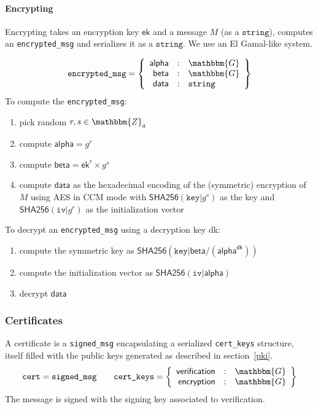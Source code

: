 \documentclass[a4paper]{article}
\newcommand{\G}{\mathbbm{G}}
\newcommand{\Z}{\mathbbm{Z}}
\newcommand{\jstring}{\texttt{string}}
\begin{document}
\paragraph{Encrypting}

Encrypting takes an encryption key $\textsf{ek}$ and a message $M$ (as
a $\jstring$), computes an \texttt{encrypted\_msg} and serializes it
as a $\jstring$. We use an El Gamal-like system.

\begin{gather*}
  \texttt{encrypted\_msg}=\left\{
    \begin{array}{rcl}
      \textsf{alpha}&:&\G\\
      \textsf{beta}&:&\G\\
      \textsf{data}&:&\jstring
    \end{array}
  \right\}
\end{gather*}
To compute the \texttt{encrypted\_msg}:
\begin{enumerate}
\item pick random $r,s\in\Z_q$
\item compute $\textsf{alpha}=g^r$
\item compute $\textsf{beta}=\textsf{ek}^r\times g^s$
\item compute $\textsf{data}$ as the hexadecimal encoding of the (symmetric)
  encryption of $M$ using AES in CCM mode with
  $\textsf{SHA256}(\texttt{key|}g^s)$ as the key and $\textsf{SHA256}(\texttt{iv|}g^r)$ as the
  initialization vector
\end{enumerate}
To decrypt an \texttt{encrypted\_msg} using a decryption key \textsf{dk}:
\begin{enumerate}
\item compute the symmetric key as $\textsf{SHA256}(\texttt{key|}\textsf{beta}/(\textsf{alpha}^{\textsf{dk}}))$
\item compute the initialization vector as $\textsf{SHA256}(\texttt{iv|}\textsf{alpha})$
\item decrypt $\textsf{data}$
\end{enumerate}

\subsubsection{Certificates}
\label{certificates}

A certificate is a \texttt{signed\_msg} encapsulating a serialized
\texttt{cert\_keys} structure, itself filled with the public keys
generated as described in section~\ref{pki}.
\begin{gather*}
  \texttt{cert}=\texttt{signed\_msg}
  \qquad
  \texttt{cert\_keys}=\left\{
    \begin{array}{rcl}
      \textsf{verification}&:&\G\\
      \textsf{encryption}&:&\G
    \end{array}
  \right\}
\end{gather*}
The message is signed with the signing key associated to
\textsf{verification}.
\end{document}
